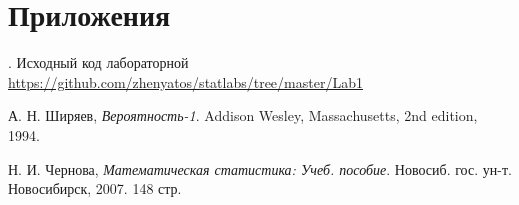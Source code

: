 \documentclass[12pt,a4paper]{article}
\begin{document}
\section{Приложения}
. Исходный код лабораторной {\url{https://github.com/zhenyatos/statlabs/tree/master/Lab1}}

\begin{thebibliography}{9} 
	 А. Н. Ширяев, \emph{Вероятность-1}. Addison Wesley, Massachusetts, 2nd edition, 1994. 
	
	 Н. И. Чернова, \emph{Математическая статистика: Учеб. пособие}. Новосиб. гос. ун-т. Новосибирск, 2007. 148 стр.
\end{thebibliography}
\end{document}
